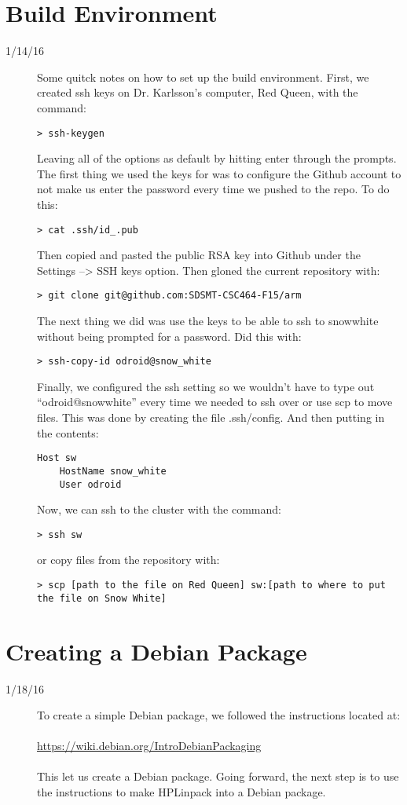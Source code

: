 \section{Build Environment}
\begin{description}
\item [1/14/16] Some quitck notes on how to set up the build environment. First, we created ssh keys on Dr. Karlsson's computer, Red Queen, with the command:
\begin{lstlisting}
> ssh-keygen
\end{lstlisting}
Leaving all of the options as default by hitting enter through the prompts.  The first thing we used the keys for was to configure the Github account to not make us enter the password every time we pushed to the repo. To do this:
\begin{lstlisting}
> cat .ssh/id_.pub
\end{lstlisting}
Then copied and pasted the public RSA key into Github under the Settings --> SSH keys option. Then gloned the current repository with:
\begin{lstlisting}
> git clone git@github.com:SDSMT-CSC464-F15/arm
\end{lstlisting}
The next thing we did was use the keys to be able to ssh to snow\textunderscore white without being prompted for a password. Did this with:
\begin{lstlisting}
> ssh-copy-id odroid@snow_white
\end{lstlisting}
Finally, we configured the ssh setting so we wouldn't have to type out ``odroid@snow\textunderscore white'' every time we needed to ssh over or use scp to move files. This was done by creating the file .ssh/config. And then putting in the contents:
\begin{lstlisting}
Host sw 
	HostName snow_white
	User odroid
\end{lstlisting}
Now, we can ssh to the cluster with the command:
\begin{lstlisting}
> ssh sw
\end{lstlisting}
or copy files from the repository with:
\begin{lstlisting}
> scp [path to the file on Red Queen] sw:[path to where to put the file on Snow White]
\end{lstlisting}
\end{description}


\section{Creating a Debian Package}
\begin{description}
\item [1/18/16] To create a simple Debian package, we followed the instructions located at:\\ \\
\url{https://wiki.debian.org/IntroDebianPackaging}\\ \\
This let us create a Debian package. Going forward, the next step is to use the instructions to make HPLinpack into a Debian package.
\end{description}

